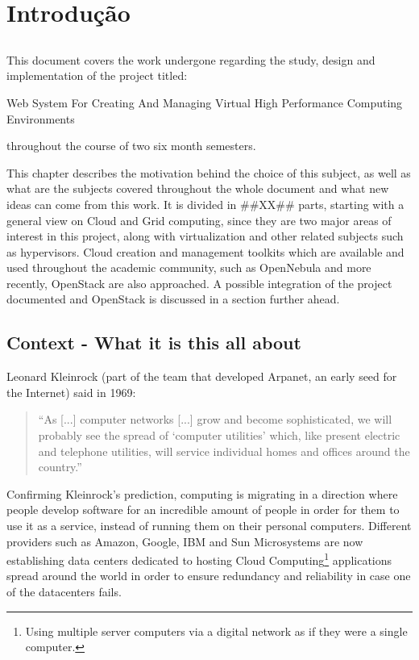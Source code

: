 \chapter{Introdução} \label{chap:intro}

\section*{}

This document covers the work undergone regarding the study, design and implementation of the project titled:

Web System For Creating And Managing Virtual High Performance Computing Environments

throughout the course of two six month semesters.


This chapter describes the motivation behind the choice of this subject, as well as what are the subjects covered throughout the whole document and what new ideas can come from this work.
It is divided in ##XX## parts, starting with a general view on Cloud and Grid computing, since they are two major areas of interest in this project, along with virtualization and other related subjects such as hypervisors. Cloud creation and management toolkits which are available and used throughout the academic community, such as OpenNebula and more recently, OpenStack are also approached.
A possible integration of the project documented and OpenStack is discussed in a section further ahead.

\section{Context - What it is this all about} \label{sec:context}

Leonard Kleinrock (part of the team that developed Arpanet, an early seed for the Internet) said in 1969:

\begin{quote}
  ``As [...] computer networks [...] grow and become sophisticated, we will probably see the spread of `computer utilities' which, like present electric and telephone utilities, will service individual homes and offices around the country.''~\cite{Buyya2009599} 
\end{quote}
	
Confirming Kleinrock's prediction, computing is migrating in a direction where people develop software for an incredible amount of people in order for them to use it as a service, instead of running them on their personal computers. Different providers such as Amazon, Google, IBM and Sun Microsystems are now establishing data centers dedicated to hosting Cloud Computing\footnote{Using multiple server computers via a digital network as if they were a single computer.} applications spread around the world in order to ensure redundancy and reliability in case one of the datacenters fails. 

